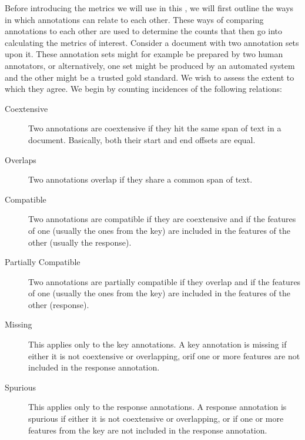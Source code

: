 
Before introducing the metrics we will use in this \chapthing, we will first
outline the ways in which annotations can relate to each other. These ways of
comparing annotations to each other are used to determine the counts that then go
into calculating the metrics of interest. Consider a document with two annotation
sets upon it. These annotation sets might for example be prepared by two human
annotators, or alternatively, one set might be produced by an automated system
and the other might be a trusted gold standard. We wish to assess the extent to
which they agree. We begin by counting incidences of the following relations:

\begin{description}

\item[Coextensive] Two annotations are coextensive if they hit the same span of
text in a document. Basically, both their start and end offsets are equal.

\item[Overlaps] Two annotations overlap if they share a common span of text.

\item[Compatible] Two annotations are compatible if they are coextensive and if
the features of one (usually the ones from the key) are included in
the features of the other (usually the response).

\item[Partially Compatible] Two annotations are partially compatible if they
overlap and if the features of one (usually the ones from the key) are included in
the features of the other (response).

\item[Missing] This applies only to the key annotations. A key annotation is
missing if either it is not coextensive or overlapping, orif one or more
features are not included in the response annotation.

\item[Spurious] This applies only to the response annotations. A response
annotation is spurious if either it is not coextensive or overlapping, or if one or
more features from the key are not included in the response
annotation.

\end{description}

